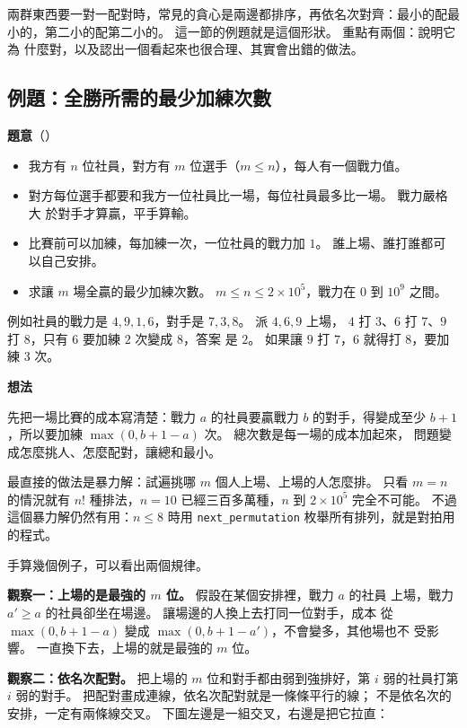 兩群東西要一對一配對時，常見的貪心是兩邊都排序，再依名次對齊：最小的配最
小的，第二小的配第二小的。 這一節的例題就是這個形狀。 重點有兩個：說明它為
什麼對，以及認出一個看起來也很合理、其實會出錯的做法。

\subsection{例題：全勝所需的最少加練次數}
\label{sec:ex-training}

\textbf{題意}（）

\begin{itemize}
\item 我方有 $n$ 位社員，對方有 $m$ 位選手（$m \le n$），每人有一個戰力值。
\item 對方每位選手都要和我方一位社員比一場，每位社員最多比一場。 戰力嚴格大
於對手才算贏，平手算輸。
\item 比賽前可以加練，每加練一次，一位社員的戰力加 $1$。 誰上場、誰打誰都可
以自己安排。
\item 求讓 $m$ 場全贏的最少加練次數。 $m \le n \le 2 \times 10^5$，戰力在
$0$ 到 $10^9$ 之間。
\end{itemize}

例如社員的戰力是 $4, 9, 1, 6$，對手是 $7, 3, 8$。 派 $4, 6, 9$ 上場，
$4$ 打 $3$、$6$ 打 $7$、$9$ 打 $8$，只有 $6$ 要加練 $2$ 次變成 $8$，答案
是 $2$。 如果讓 $9$ 打 $7$，$6$ 就得打 $8$，要加練 $3$ 次。

\textbf{想法}

先把一場比賽的成本寫清楚：戰力 $a$ 的社員要贏戰力 $b$ 的對手，得變成至少
$b + 1$，所以要加練 $\max(0, b + 1 - a)$ 次。 總次數是每一場的成本加起來，
問題變成怎麼挑人、怎麼配對，讓總和最小。

最直接的做法是暴力解：試遍挑哪 $m$ 個人上場、上場的人怎麼排。 只看
$m = n$ 的情況就有 $n!$ 種排法，$n = 10$ 已經三百多萬種，$n$ 到
$2 \times 10^5$ 完全不可能。 不過這個暴力解仍然有用：$n \le 8$ 時用
\texttt{next\_permutation} 枚舉所有排列，就是對拍用的程式。

手算幾個例子，可以看出兩個規律。

\textbf{觀察一：上場的是最強的 $m$ 位。} 假設在某個安排裡，戰力 $a$ 的社員
上場，戰力 $a' \ge a$ 的社員卻坐在場邊。 讓場邊的人換上去打同一位對手，成本
從 $\max(0, b + 1 - a)$ 變成 $\max(0, b + 1 - a')$，不會變多，其他場也不
受影響。 一直換下去，上場的就是最強的 $m$ 位。

\textbf{觀察二：依名次配對。} 把上場的 $m$ 位和對手都由弱到強排好，第 $i$
弱的社員打第 $i$ 弱的對手。 把配對畫成連線，依名次配對就是一條條平行的線；
不是依名次的安排，一定有兩條線交叉。 下圖左邊是一組交叉，右邊是把它拉直：

